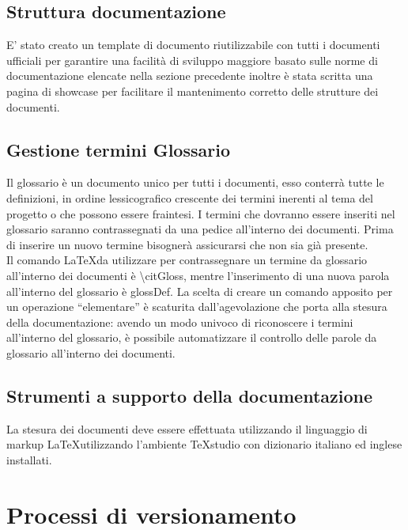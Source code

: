 \documentclass[NormeDiProgetto.tex]{subfiles}
\begin{document}
	\subsection{Struttura documentazione}
	E' stato creato un template di documento riutilizzabile con tutti i documenti ufficiali per garantire una facilità di sviluppo maggiore basato sulle norme di documentazione elencate nella sezione precedente inoltre è stata scritta una pagina di showcase per facilitare il mantenimento corretto delle strutture dei documenti.
	
	\subsection{Gestione termini Glossario}
	Il glossario è un documento unico per tutti i documenti, esso conterrà tutte le definizioni, in ordine lessicografico crescente dei termini inerenti al tema del progetto o che possono essere fraintesi. I termini che dovranno essere inseriti nel glossario saranno contrassegnati da una \citGloss{} pedice all’interno dei documenti. Prima di inserire un nuovo termine bisognerà assicurarsi che non sia già presente. \\
	Il comando \LaTeX da utilizzare per contrassegnare un termine da glossario all’interno dei documenti è \textbackslash citGloss, mentre l’inserimento di una nuova parola all’interno del glossario è glossDef. %
	La scelta di creare un comando apposito per un operazione “elementare” è scaturita dall’agevolazione che porta alla stesura della documentazione: avendo un modo univoco di riconoscere i termini all’interno del glossario, è possibile automatizzare il controllo delle parole da glossario all’interno dei documenti.
	
	\subsection{Strumenti a supporto della documentazione} %
	La stesura dei documenti deve essere effettuata utilizzando il linguaggio di markup \LaTeX  utilizzando l'ambiente TeXstudio con dizionario italiano ed inglese installati.
	
	
	\section{Processi di versionamento}
	
\end{document}
